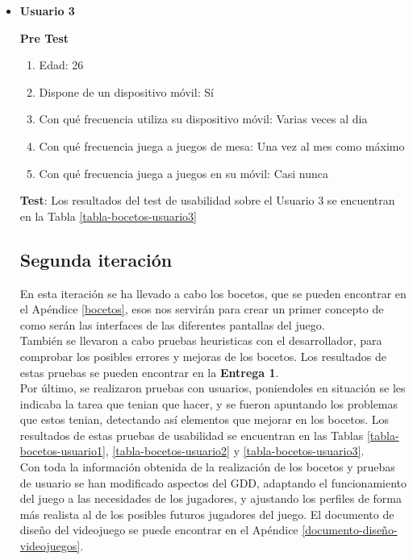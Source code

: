 \begin{itemize}
  \item \textbf{Usuario 3}

  \textbf{Pre Test}

  \begin{enumerate}
    \item Edad: 26
    \item Dispone de un dispositivo móvil: Sí
    \item Con qué frecuencia utiliza su dispositivo móvil: Varias veces al dia
    \item Con qué frecuencia juega a juegos de mesa: Una vez al mes como máximo
    \item Con qué frecuencia juega a juegos en su móvil: Casi nunca
  \end{enumerate}

  \textbf{Test}: Los resultados del test de usabilidad sobre el Usuario 3 se encuentran en la Tabla \ref{tabla-bocetos-usuario3}

\subsection{Segunda iteración}
En esta iteración se ha llevado a cabo los bocetos, que se pueden encontrar en el Apéndice \ref{bocetos}, esos nos servirán para crear un primer concepto de como serán las interfaces de las diferentes pantallas del juego.\\

También se llevaron a cabo pruebas heuristicas con el desarrollador, para comprobar los posibles errores y mejoras de los bocetos. Los resultados de estas pruebas se pueden encontrar en la \textbf{Entrega 1}.\\

Por último, se realizaron pruebas con usuarios, poniendoles en situación se les indicaba la tarea que tenian que hacer, y se fueron apuntando los problemas que estos tenian, detectando así elementos que mejorar en los bocetos. Los resultados de estas pruebas de usabilidad se encuentran en las Tablas \ref{tabla-bocetos-usuario1}, \ref{tabla-bocetos-usuario2} y \ref{tabla-bocetos-usuario3}.\\

Con toda la información obtenida de la realización de los bocetos y pruebas de usuario se han modificado aspectos del GDD, adaptando el funcionamiento del juego a las necesidades de los jugadores, y ajustando los perfiles de forma más realista al de los posibles futuros jugadores del juego. El documento de diseño del videojuego se puede encontrar en el Apéndice \ref{documento-diseño-videojuegos}.


\end{itemize}
